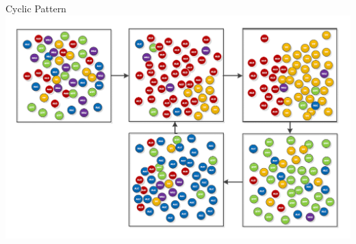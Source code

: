 \documentclass[final]{beamer}
\begin{document}
\begin{frame}[t]{Cyclic Pattern}
	\includegraphics[width=\textwidth]{cyclicpattern01.png}
\end{frame}

\end{document}
